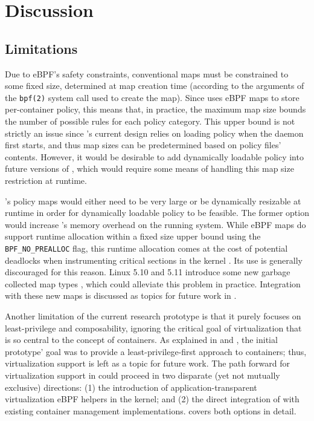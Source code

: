 \section{Discussion}
\label{sec:discussion}

\subsection{Limitations}

Due to eBPF's safety constraints, conventional maps must be constrained to some fixed size, determined at map creation time (according to the arguments of the \texttt{bpf(2)} system call used to create the map). Since \bpfcontain{} uses eBPF maps to store per-container policy, this means that, in practice, the maximum map size bounds the number of possible rules for each policy category. This upper bound is not strictly an issue since \bpfcontain{}'s current design relies on loading policy when the daemon first starts, and thus map sizes can be predetermined based on policy files' contents. However, it would be desirable to add dynamically loadable policy into future versions of \bpfcontain{}, which would require some means of handling this map size restriction at runtime.

\bpfcontain{}'s policy maps would either need to be very large or be dynamically resizable at runtime in order for dynamically loadable policy to be feasible. The former option would increase \bpfcontain{}'s memory overhead on the running system. While eBPF maps do support runtime allocation within a fixed size upper bound using the \texttt{BPF\_NO\_PREALLOC} flag, this runtime allocation comes at the cost of potential deadlocks when instrumenting critical sections in the kernel \cite{starovoitov2016_prealloc}. Its use is generally discouraged for this reason. Linux 5.10 and 5.11 introduce some new garbage collected map types \cite{singh2020_task_local_storage, singh2020_inode_local_storage}, which could alleviate this problem in practice. Integration with these new maps is discussed as topics for future work in .

Another limitation of the current research prototype is that it purely focuses on least-privilege and composability, ignoring the critical goal of virtualization that is so central to the concept of containers. As explained in  and , the initial \bpfcontain{} prototype' goal was to provide a least-privilege-first approach to containers; thus, virtualization support is left as a topic for future work. The path forward for virtualization support in \bpfcontain{} could proceed in two disparate (yet not mutually exclusive) directions: (1) the introduction of application-transparent virtualization eBPF helpers in the kernel; and (2) the direct integration of \bpfcontain{} with existing container management implementations.  covers both options in detail.

